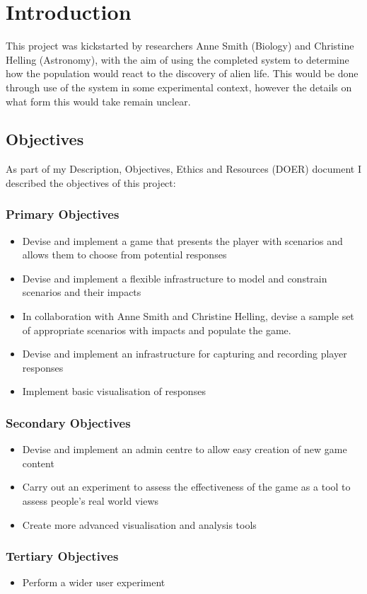 \chapter{Introduction}
This project was kickstarted by researchers Anne Smith (Biology) and Christine Helling (Astronomy), with the aim of using the completed system to determine how the population would react to the discovery of alien life. This would be done through use of the system in some experimental context, however the details on what form this would take remain unclear. 


\section{Objectives}
As part of my Description, Objectives, Ethics and Resources (DOER) document I described the objectives of this project:

\subsection{Primary Objectives}
\begin{itemize}
    \item Devise and implement a game that presents the player with scenarios and allows them to choose from potential responses
    \item Devise and implement a flexible infrastructure to model and constrain scenarios and their impacts
    \item In collaboration with Anne Smith and Christine Helling, devise a sample set of appropriate scenarios with impacts and populate the game.
    \item Devise and implement an infrastructure for capturing and recording player responses
    \item Implement basic visualisation of responses
\end{itemize}
\subsection{Secondary Objectives}
\begin{itemize}
    \item Devise and implement an admin centre to allow easy creation of new game content
    \item Carry out an experiment to assess the effectiveness of the game as a tool to assess people's real world views
    \item Create more advanced visualisation and analysis tools
\end{itemize}
\subsection{Tertiary Objectives}
\begin{itemize}
    \item Perform a wider user experiment
\end{itemize}